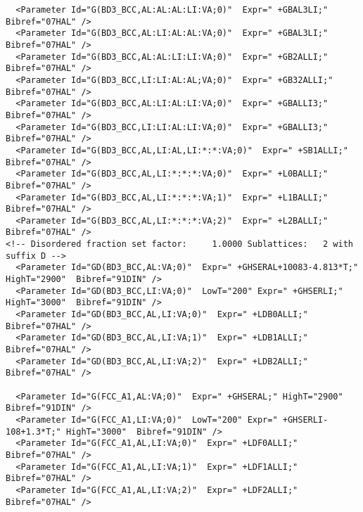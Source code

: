 \documentclass{article}
\begin{document}
\begin{appendices}
\begin{verbatim}
  <Parameter Id="G(BD3_BCC,AL:AL:AL:LI:VA;0)"  Expr=" +GBAL3LI;"  Bibref="07HAL" />
  <Parameter Id="G(BD3_BCC,AL:LI:AL:AL:VA;0)"  Expr=" +GBAL3LI;"  Bibref="07HAL" />
  <Parameter Id="G(BD3_BCC,AL:AL:LI:LI:VA;0)"  Expr=" +GB2ALLI;"  Bibref="07HAL" />
  <Parameter Id="G(BD3_BCC,LI:LI:AL:AL;VA;0)"  Expr=" +GB32ALLI;"  Bibref="07HAL" />
  <Parameter Id="G(BD3_BCC,AL:LI:AL:LI:VA;0)"  Expr=" +GBALLI3;"  Bibref="07HAL" />
  <Parameter Id="G(BD3_BCC,LI:LI:AL:LI:VA;0)"  Expr=" +GBALLI3;"  Bibref="07HAL" />
  <Parameter Id="G(BD3_BCC,AL,LI:AL,LI:*:*:VA;0)"  Expr=" +SB1ALLI;"  Bibref="07HAL" />
  <Parameter Id="G(BD3_BCC,AL,LI:*:*:*:VA;0)"  Expr=" +L0BALLI;"  Bibref="07HAL" />
  <Parameter Id="G(BD3_BCC,AL,LI:*:*:*:VA;1)"  Expr=" +L1BALLI;"  Bibref="07HAL" />
  <Parameter Id="G(BD3_BCC,AL,LI:*:*:*:VA;2)"  Expr=" +L2BALLI;"  Bibref="07HAL" />
<!-- Disordered fraction set factor:     1.0000 Sublattices:   2 with suffix D -->
  <Parameter Id="GD(BD3_BCC,AL:VA;0)"  Expr=" +GHSERAL+10083-4.813*T;" HighT="2900"  Bibref="91DIN" />
  <Parameter Id="GD(BD3_BCC,LI:VA;0)"  LowT="200" Expr=" +GHSERLI;" HighT="3000"  Bibref="91DIN" />
  <Parameter Id="GD(BD3_BCC,AL,LI:VA;0)"  Expr=" +LDB0ALLI;"  Bibref="07HAL" />
  <Parameter Id="GD(BD3_BCC,AL,LI:VA;1)"  Expr=" +LDB1ALLI;"  Bibref="07HAL" />
  <Parameter Id="GD(BD3_BCC,AL,LI:VA;2)"  Expr=" +LDB2ALLI;"  Bibref="07HAL" />

  <Parameter Id="G(FCC_A1,AL:VA;0)"  Expr=" +GHSERAL;" HighT="2900"  Bibref="91DIN" />
  <Parameter Id="G(FCC_A1,LI:VA;0)"  LowT="200" Expr=" +GHSERLI-108+1.3*T;" HighT="3000"  Bibref="91DIN" />
  <Parameter Id="G(FCC_A1,AL,LI:VA;0)"  Expr=" +LDF0ALLI;"  Bibref="07HAL" />
  <Parameter Id="G(FCC_A1,AL,LI:VA;1)"  Expr=" +LDF1ALLI;"  Bibref="07HAL" />
  <Parameter Id="G(FCC_A1,AL,LI:VA;2)"  Expr=" +LDF2ALLI;"  Bibref="07HAL" />


\end{verbatim}
\end{appendices}
\end{document}
